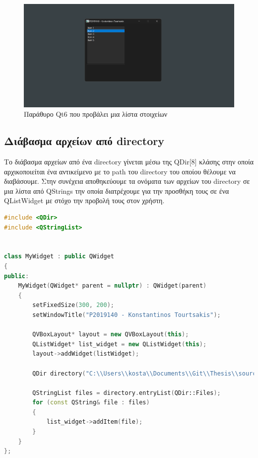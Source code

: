 \begin{figure}[H]
    \centering
    \includegraphics[width=1.0\textwidth]{./images/QListWidget.png}
    \caption{Παράθυρο Qt6 που προβάλει μια λίστα στοιχείων}
\end{figure}


\subsection{Διάβασμα αρχείων από directory}
Το διάβασμα αρχείων από ένα directory γίνεται μέσω της QDir[8] κλάσης στην οποία
αρχικοποιείται ένα αντικείμενο με το path του directory του οποίου θέλουμε να
διαβάσουμε. Στην συνέχεια αποθηκεύουμε τα ονόματα των αρχείων του directory σε μια λίστα
από QStrings την οποία διατρέχουμε για την προσθήκη τους σε ένα QListWidget
με στόχο την προβολή τους στον χρήστη.
\begin{lstlisting}[language=C++, style=cppstyle]
#include <QDir>
#include <QStringList>


class MyWidget : public QWidget 
{
public:
    MyWidget(QWidget* parent = nullptr) : QWidget(parent) 
    {
        setFixedSize(300, 200);
        setWindowTitle("P2019140 - Konstantinos Tourtsakis");

        QVBoxLayout* layout = new QVBoxLayout(this);
        QListWidget* list_widget = new QListWidget(this);
        layout->addWidget(listWidget);

        QDir directory("C:\\Users\\kosta\\Documents\\Git\\Thesis\\source\\x64\\Debug");

        QStringList files = directory.entryList(QDir::Files);
        for (const QString& file : files) 
        {
            list_widget->addItem(file);
        }
    }
};
\end{lstlisting}


